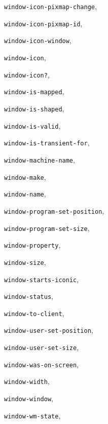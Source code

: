 \begin{theindex}
\item {\tt window-icon-pixmap-change}, {\bf\pageref{window-icon-pixmap-change}}
\item {\tt window-icon-pixmap-id}, {\bf\pageref{window-icon-pixmap-id}}
\item {\tt window-icon-window}, {\bf\pageref{window-icon-window}}
\item {\tt window-icon}, {\bf\pageref{window-icon}}
\item {\tt window-icon?}, {\bf\pageref{window-icon?}}
\item {\tt window-is-mapped}, {\bf\pageref{window-is-mapped}}
\item {\tt window-is-shaped}, {\bf\pageref{window-is-shaped}}
\item {\tt window-is-valid}, {\bf\pageref{window-is-valid}}
\item {\tt window-is-transient-for}, {\bf\pageref{window-is-transient-for}}
\item {\tt window-machine-name}, {\bf\pageref{window-machine-name}}
\item {\tt window-make}, {\bf\pageref{window-make}}
\item {\tt window-name}, {\bf\pageref{window-name}}
\item {\tt window-program-set-position}, {\bf\pageref{window-program-set-position}}
\item {\tt window-program-set-size}, {\bf\pageref{window-program-set-size}}
\item {\tt window-property}, {\bf\pageref{window-property}}
\item {\tt window-size}, {\bf\pageref{window-size}}
\item {\tt window-starts-iconic}, {\bf\pageref{window-starts-iconic}}
\item {\tt window-status}, {\bf\pageref{window-status}}
\item {\tt window-to-client}, {\bf\pageref{window-to-client}}
\item {\tt window-user-set-position}, {\bf\pageref{window-user-set-position}}
\item {\tt window-user-set-size}, {\bf\pageref{window-user-set-size}}
\item {\tt window-was-on-screen}, {\bf\pageref{window-was-on-screen}}
\item {\tt window-width}, {\bf\pageref{window-width}}
\item {\tt window-window}, {\bf\pageref{window-window}}
\item {\tt window-wm-state}, {\bf\pageref{window-wm-state}}

\end{theindex}
